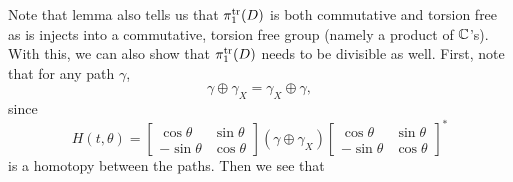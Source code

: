 Note that lemma also tells us that \(\pi_1^{\operatorname{tr}}(D)\) is both commutative and
torsion free as is injects into a commutative, torsion free group (namely a
product of \(\mathbb{C} \)'s). With this, we can also show that \(\pi_1^{\operatorname{tr}}(D)\)
needs to be divisible as well. First, note that for any path \(\gamma\),
\[
  \gamma\oplus\gamma_X = \gamma_X\oplus\gamma,
\]
since
\[
  H(t,\theta)  = \begin{bmatrix} \cos \theta & \sin \theta \\ -\sin \theta& \cos \theta \end{bmatrix}
  \left( \gamma \oplus \gamma_X \right)
 \begin{bmatrix} \cos \theta & \sin \theta \\ -\sin \theta& \cos \theta \end{bmatrix}^*
\]
is a homotopy between the paths. Then we see that
